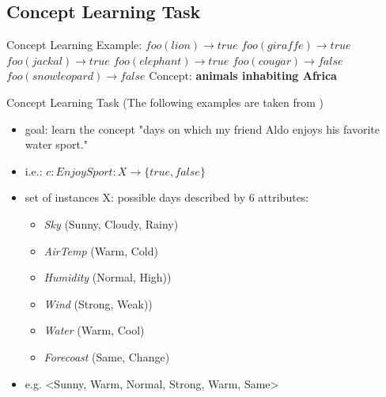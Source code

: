 \documentclass{beamer}
\begin{document}
\subsection{Concept Learning Task}
\begin{frame}{Concept Learning}
Example:\newline
$foo(lion) \rightarrow true $\newline
$foo(giraffe) \rightarrow true $\newline
$foo(jackal) \rightarrow true $\newline
$foo(elephant) \rightarrow true $\newline
$foo(cougar) \rightarrow false $\newline
$foo(snow leopard) \rightarrow false $\newline
Concept: \textbf{animals inhabiting Africa}
\end{frame}

\begin{frame}{Concept Learning Task}
(The following examples are taken from \cite{mitchell1997a})
\begin{itemize}
\item goal: learn the concept "days on which my friend Aldo enjoys his favorite water sport."
\item i.e.: $c: EnjoySport: X \rightarrow \{true, false\}$
\item set of instances X: possible days described by 6 attributes: \begin{itemize}
\item \emph{Sky} (Sunny, Cloudy, Rainy)
\item \emph{AirTemp} (Warm, Cold)
\item \emph{Humidity} (Normal, High))
\item \emph{Wind} (Strong, Weak))
\item \emph{Water} (Warm, Cool)
\item \emph{Forecoast} (Same, Change)
\end{itemize}
\item e.g. <Sunny, Warm, Normal, Strong, Warm, Same>
\end{itemize}
\end{frame}
\end{document}
